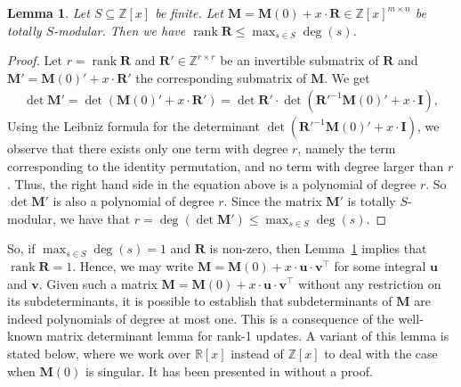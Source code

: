 \documentclass[a4paper, 11pt]{article}
\DeclareMathOperator{\rank}{rank}
\newcommand{\R}{\mathbb{R}}
\newcommand{\Z}{\mathbb{Z}}
\newcommand{\bv}{\bm{v}}
\newcommand{\bu}{\bm{u}}
\newcommand{\bM}{\bm{M}}
\newcommand{\bR}{\bm{R}}
\newcommand{\indet}{x}
\newcommand{\polyring}{\Z[\indet]}
\newcommand{\polyS}{S}
\newcommand{\polyM}{\bM}
\newcommand{\id}{\bm{I}}
\newtheorem{lemma}{Lemma}
\begin{document}
	\begin{lemma}{\cite[Lemma~4]{celayakuhlmannweismantel2024matricespolynomial}}
		\label{lemma_rank_coefficient_matrix}
		Let $S\subseteq \polyring$ be finite. Let $\polyM = \bM(0) + \indet\cdot \bR \in\polyring^{m\times n}$ be totally $\polyS$-modular. Then we have $\rank\bR\leq \max_{s\in \polyS}\deg(s)$. 
	\end{lemma}
	\begin{proof}
		Let $r = \rank \bR$ and $\bR'\in\Z^{r\times r}$ be an invertible submatrix of $\bR$ and $\bM' = \bM(0)' + \indet \cdot \bR'$ the corresponding submatrix of $\bM$.  
		We get
		\begin{align*}
			\det\bM' = \det\left(\bM(0)' + \indet \cdot \bR'\right) = \det\bR'\cdot\det\left(\bR'^{-1}\bM(0)' + \indet \cdot \id\right),
		\end{align*} 
		Using the Leibniz formula for the determinant $\det(\bR'^{-1}\bM(0)' + \indet \cdot \bm{I})$, we observe that there exists only one term with degree $r$, namely the term corresponding to the identity permutation, and no term with degree larger than $r$. Thus, the right hand side in the equation above is a polynomial of degree $r$. So $\det\polyM'$ is also a polynomial of degree $r$. Since the matrix $\polyM'$ is totally $\polyS$-modular, we have that $r = \deg(\det\polyM')\leq \max_{s\in \polyS}\deg(s)$. 
	\end{proof}
	
	So, if $\max_{s\in \polyS}\deg(s) = 1$ and $\bR$ is non-zero, then Lemma~\ref{lemma_rank_coefficient_matrix} implies that $\rank\bR = 1$. Hence, we may write $\bM = \bM(0) + \indet\cdot \bu\cdot \bv^\top$ for some integral $\bu$ and $\bv$. 
	Given such a matrix $\bM = \bM(0) + \indet\cdot \bu\cdot \bv^\top$ without any restriction on its subdeterminants, it is possible to establish that subdeterminants of $\polyM$ are indeed polynomials of degree at most one. This is a consequence of the well-known matrix determinant lemma for rank-1 updates. A variant of this lemma is stated below, where we work over $\R[\indet]$ instead of $\polyring$ to deal with the case when $\bM(0)$ is singular. It has been presented in \cite[Lemma~5]{celayakuhlmannweismantel2024matricespolynomial} without a proof.
	
\end{document}
